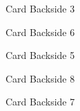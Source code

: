 \documentclass[a4paper]{article}
\begin{document}
{	{
		\centerline{{
				Card Backside 3
		}}
	}
	\newpage

	{
		\centerline{{
				Card Backside 6
		}}
	}
	\newpage

	{
		\centerline{{
				Card Backside 5
		}}
	}
	\newpage

	{
		\centerline{{
				Card Backside 8
		}}
	}
	\newpage

	{
		\centerline{{
				Card Backside 7
		}}
	}
	\newpage

}
\end{document}
